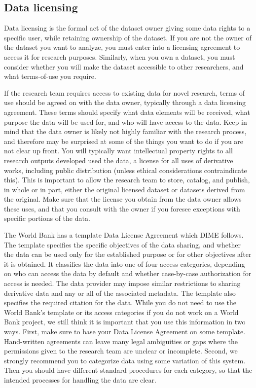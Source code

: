 \subsection{Data licensing}

Data licensing
is the formal act of the dataset owner
giving some data rights to a specific user,
while retaining ownership of the dataset.
If you are not the owner of the dataset you want to analyze,
you must enter into a licensing agreement to access it for research purposes.
Similarly, when you own a dataset,
you must consider whether you will make the dataset accessible to other researchers,
and what terms-of-use you require.

If the research team requires access to existing data for novel research,
terms of use should be agreed on with the data owner,
typically through a data licensing agreement.
These terms should specify what data elements will be received,
what purpose the data will be used for, and who will have access to the data.
Keep in mind that the data owner is likely not highly familiar
with the research process, and therefore may be surprised
at some of the things you want to do if you are not clear up front.
You will typically want intellectual property rights to all research outputs developed used the data,
a license for all uses of derivative works, including public distribution
(unless ethical considerations contraindicate this).
This is important to allow the research team to store, catalog, and publish, in whole or in part,
either the original licensed dataset or datasets derived from the original.
Make sure that the license you obtain from the data owner allows these uses,
and that you consult with the owner
if you foresee exceptions with specific portions of the data.

The World Bank has a template Data License Agreement which DIME follows.
The template specifies the specific objectives of the data sharing,
and whether the data can be used only for the established purpose
or for other objectives after it is obtained.
It classifies the data into one of four access categories,
depending on who can access the data by default
and whether case-by-case authorization for access is needed.
The data provider may impose similar restrictions
to sharing derivative data and any or all of the associated metadata.
The template also specifies the required citation for the data.
While you do not need to use the World Bank's template
or its access categories if you do not work on a World Bank project,
we still think it is important that you use this information in two ways.
First, make sure to base your Data License Agreement on some template.
Hand-written agreements can leave many legal ambiguities or gaps
where the permissions given to the research team are unclear or incomplete.
Second, we strongly recommend you to categorize data using some variation of this system.
Then you should have different standard procedures for each category,
so that the intended processes for handling the data are clear.


